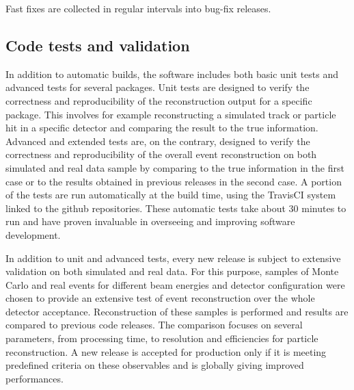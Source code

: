 Fast fixes are collected in regular intervals into bug-fix releases.

\subsection{Code tests and validation}\label{sec:tests}
In addition to automatic builds, the software includes both basic unit tests and advanced tests for several packages. Unit tests are designed to verify the correctness and reproducibility of the reconstruction output for a specific package. This involves for example reconstructing a simulated track or particle hit in a specific detector and comparing the result to the true information. Advanced and extended tests are, on the contrary, designed to verify the correctness and reproducibility of the overall event reconstruction on both simulated and real data sample by comparing to the true information in the first case or to the results obtained in previous releases in the second case. A portion of the tests are run automatically at the build time, using the TravisCI system linked to the github repositories.  These automatic tests take about 30 minutes to run and have proven invaluable in overseeing and improving software development.

In addition to unit and advanced tests, every new release is subject to extensive validation on both simulated and real data. For this purpose, samples of Monte Carlo and real events for different beam energies and detector configuration were chosen to provide an extensive test of event reconstruction over the whole detector acceptance. Reconstruction of these samples is performed and results are compared to previous code releases. The comparison focuses on several parameters, from processing time, to resolution and efficiencies for particle reconstruction. A new release is accepted for production only if it is meeting predefined criteria on these observables and is globally giving improved performances. 
